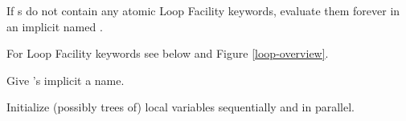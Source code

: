 \begin{LIST}{1cm}

  {
   If s do not contain any atomic Loop Facility
  keywords, evaluate them forever in an implicit  named \NIL.
  }

  {
   For Loop Facility keywords
  see below and Figure \ref{loop-overview}.
  }

  \begin{LIST}{.5cm}
    
    {
    Give 's implicit  a name.
    }

    {
    Initialize (possibly trees of) local variables 
    sequentially and  in parallel. 
    }


\end{LIST}
\end{LIST}
